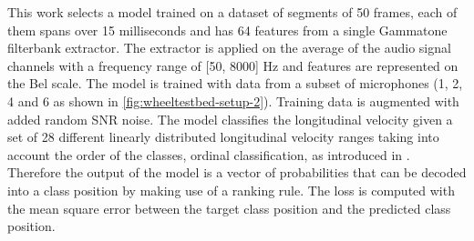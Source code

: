
This work selects a model trained on a dataset of segments of 50 frames, each
of them spans over 15 milliseconds and has 64 features from a single Gammatone
filterbank extractor. The extractor is applied on the average of the audio
signal channels with a frequency range of [50, 8000] Hz and features are
represented on the Bel scale. The model is trained with data from a subset of
microphones (1, 2, 4 and 6 as shown in \cref{fig:wheeltestbed-setup-2}).
Training data is augmented with added random SNR noise. The model classifies
the longitudinal velocity given a set of 28 different linearly distributed
longitudinal velocity ranges taking into account the order of the classes,
ordinal classification, as introduced in \cite{ordclass2006}. Therefore the
output of the model is a vector of probabilities that can be decoded into a
class position by making use of a ranking rule. The loss is computed with the
mean square error between the target class position and the predicted class
position.